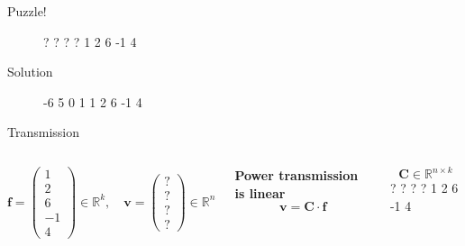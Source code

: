 \documentclass[10pt]{beamer}
\newcommand{\mat}[1]{\ensuremath{\boldsymbol{{#1}}}}
\begin{document}
\begin{frame}{Puzzle!}
    \begin{figure}
        \centering
        \graafjeduitsland
        {?}
        {?}
        {?}
        {?}
        {1}
        {2}
        {6}
        {-1}
        {4}
    \end{figure}
\end{frame}
\begin{frame}{Solution}
    \begin{figure}
        \centering
        \graafjeduitsland
        {-6}
        {5}
        {0}
        {1}
        {1}
        {2}
        {6}
        {-1}
        {4}
    \end{figure}
\end{frame}
\begin{frame}{Transmission}
    \begin{columns}[T,onlytextwidth]
    \[\mat{f}=\begin{pmatrix}
    1\\2\\6\\-1\\4
    \end{pmatrix} \in \mathbb{R}^k, \quad \mat{v}=\begin{pmatrix}
    ?\\?\\?\\?
    \end{pmatrix}\in \mathbb{R}^n\]
    {
    \begin{block}{\textbf{Power transmission is linear}}
        \[\mat{v} = \mat{C}\cdot \mat{f}\]
      \end{block}
      }
    \[\mat{C} \in \mathbb{R}^{n\times k}\]
    \graafjeduitsland
        {?}
        {?}
        {?}
        {?}
        {1}
        {2}
        {6}
        {-1}
        {4}
    \end{columns}
\end{frame}
\end{document}
